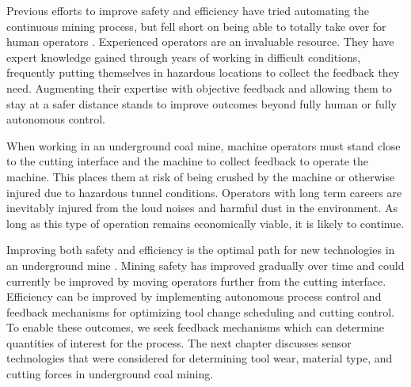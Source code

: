 Previous efforts to improve safety and efficiency have tried automating the continuous mining process,
but fell short on being able to totally take over for human operators \cite{11124/170545, schiffbauer1988testbed}. 
Experienced operators are an invaluable resource. 
They have expert knowledge gained through years of working in difficult conditions,
frequently putting themselves in hazardous locations to collect the feedback they need.
Augmenting their expertise with objective feedback and allowing them to stay at a safer distance
stands to improve outcomes beyond fully human or fully autonomous control.

When working in an underground coal mine, machine operators must stand close to the cutting interface
and the machine to collect feedback to operate the machine. This places them at risk of being crushed 
by the machine or otherwise injured due to hazardous tunnel conditions.
Operators with long term careers are inevitably injured from the loud noises and harmful dust in the environment.
As long as this type of operation remains economically viable, it is likely to continue.

Improving both safety and efficiency is the optimal path for new technologies in an underground mine \cite{Sider1983}.
Mining safety has improved gradually over time and could currently 
be improved by moving operators further from the cutting interface.
Efficiency can be improved by implementing autonomous process control and feedback mechanisms
for optimizing tool change scheduling and cutting control.
To enable these outcomes, we seek feedback mechanisms which can determine quantities of interest for the process.
The next chapter discusses sensor technologies that were considered for 
determining tool wear, material type, and cutting forces in underground coal mining.

